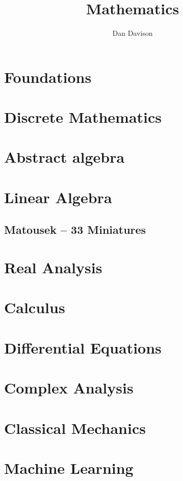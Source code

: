 \documentclass{book}
\title{Mathematics}
\author{Dan Davison}
\begin{document}
\frontmatter
\maketitle
\tableofcontents
\mainmatter


\chapter{Foundations}


\chapter{Discrete Mathematics}


\chapter{Abstract algebra}


\chapter{Linear Algebra}

\section{Matousek -- 33 Miniatures}


\chapter{Real Analysis}


\chapter{Calculus}



\chapter{Differential Equations}


\chapter{Complex Analysis}


\chapter{Classical Mechanics}


\chapter{Machine Learning}


\end{document}
